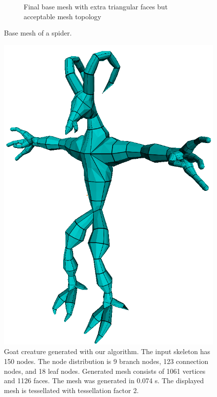 \begin{figure}
\begin{subfigure}[b]{0.4\textwidth}
                \caption{Final base mesh with extra triangular faces but acceptable mesh topology}
                \label{fig:pavuk_mesh_2}
        \end{subfigure}
        \caption[Base mesh of a spider]{Base mesh of a spider.}\label{fig:pavuk}
\end{figure}

\begin{figure}
    \centering
    \includegraphics[width=\textwidth]{images/goat_1.png}
    \caption[Generated goat creature]{Goat creature generated with our algorithm. The input skeleton has 150 nodes. The node distribution is 9 branch nodes, 123 connection nodes, and 18 leaf nodes. Generated mesh consists of 1061 vertices and 1126 faces. The mesh was generated in 0.074 s. The displayed mesh is tessellated with tessellation factor 2.}
    \label{fig:result_goat}
\end{figure}

